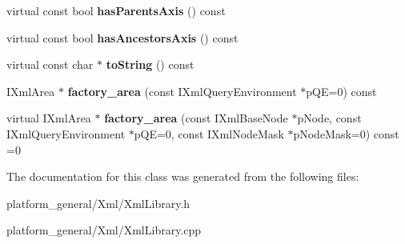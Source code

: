 \begin{DoxyCompactItemize}
\item 
\hypertarget{classgeneral__server_1_1XmlLibrary_aa46089b581e92d129b4bca575a41e4ad}{virtual const bool {\bfseries has\-Parents\-Axis} () const }\label{classgeneral__server_1_1XmlLibrary_aa46089b581e92d129b4bca575a41e4ad}

\item 
\hypertarget{classgeneral__server_1_1XmlLibrary_a0503c6301143dc019c4d4ca0f5f8f84f}{virtual const bool {\bfseries has\-Ancestors\-Axis} () const }\label{classgeneral__server_1_1XmlLibrary_a0503c6301143dc019c4d4ca0f5f8f84f}

\item 
\hypertarget{classgeneral__server_1_1XmlLibrary_add1769c8dc41b7fe715e6e6954df35b3}{virtual const char $\ast$ {\bfseries to\-String} () const }\label{classgeneral__server_1_1XmlLibrary_add1769c8dc41b7fe715e6e6954df35b3}

\item 
\hypertarget{classgeneral__server_1_1XmlLibrary_adf7f27b9f44bd381db1d9810b156fd14}{\-I\-Xml\-Area $\ast$ {\bfseries factory\-\_\-area} (const \-I\-Xml\-Query\-Environment $\ast$p\-Q\-E=0) const }\label{classgeneral__server_1_1XmlLibrary_adf7f27b9f44bd381db1d9810b156fd14}

\item 
\hypertarget{classgeneral__server_1_1XmlLibrary_a1460b1b911a6bf508a0144829f9bf30d}{virtual \-I\-Xml\-Area $\ast$ {\bfseries factory\-\_\-area} (const \-I\-Xml\-Base\-Node $\ast$p\-Node, const \-I\-Xml\-Query\-Environment $\ast$p\-Q\-E=0, const \-I\-Xml\-Node\-Mask $\ast$p\-Node\-Mask=0) const =0}\label{classgeneral__server_1_1XmlLibrary_a1460b1b911a6bf508a0144829f9bf30d}

\end{DoxyCompactItemize}


\-The documentation for this class was generated from the following files\-:\begin{DoxyCompactItemize}
\item 
platform\-\_\-general/\-Xml/\-Xml\-Library.\-h\item 
platform\-\_\-general/\-Xml/\-Xml\-Library.\-cpp\end{DoxyCompactItemize}
